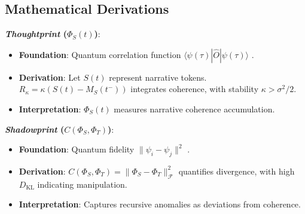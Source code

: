 \documentclass[11pt]{article}
\newcommand{\thoughtprint}{\textit{Thoughtprint}}
\newcommand{\shadowprint}{\textit{Shadowprint}}
\begin{document}
\subsection{Mathematical Derivations}
\textbf{\thoughtprint{} (\(\Phi_S(t)\))}:  
\begin{itemize}
    \item \textbf{Foundation}: Quantum correlation function \(\langle \psi(\tau) | \hat{O} | \psi(\tau) \rangle\) \citep{sakurai2020}.
    \item \textbf{Derivation}: Let \(S(t)\) represent narrative tokens. \(R_\kappa = \kappa(S(t) - M_S(t^-))\) integrates coherence, with stability \(\kappa > \sigma^2/2\).
    \item \textbf{Interpretation}: \(\Phi_S(t)\) measures narrative coherence accumulation.
\end{itemize}
\textbf{\shadowprint{} (\(C(\Phi_S, \Phi_T)\))}:  
\begin{itemize}
    \item \textbf{Foundation}: Quantum fidelity \(\|\psi_i - \psi_j\|^2\) \citep{nielsen2000}.
    \item \textbf{Derivation}: \(C(\Phi_S, \Phi_T) = \|\Phi_S - \Phi_T\|_\mathcal{F}^2\) quantifies divergence, with high \(D_{\mathrm{KL}}\) indicating manipulation.
    \item \textbf{Interpretation}: Captures recursive anomalies as deviations from coherence.
\end{itemize}

\clearpage



\end{document}
